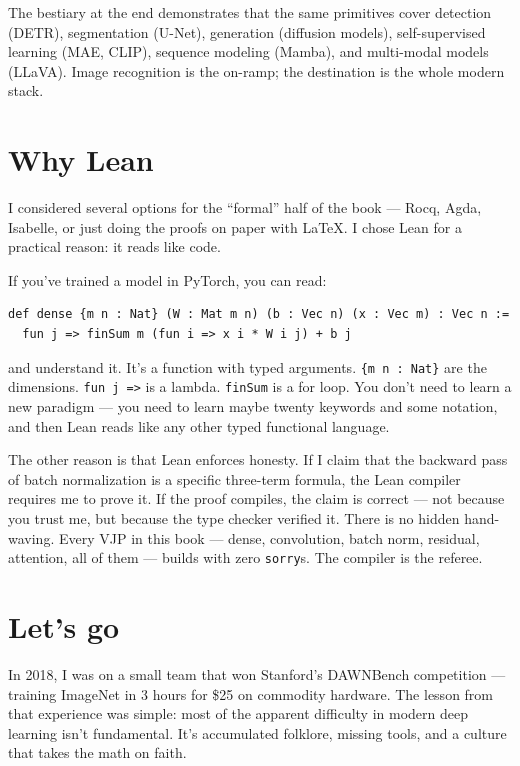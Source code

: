 The bestiary at the end demonstrates that the same primitives cover
detection (DETR), segmentation (U-Net), generation (diffusion models),
self-supervised learning (MAE, CLIP), sequence modeling (Mamba), and
multi-modal models (LLaVA). Image recognition is the on-ramp; the
destination is the whole modern stack.

\section*{Why Lean}

I considered several options for the ``formal'' half of the book ---
Rocq, Agda, Isabelle, or just doing the proofs on paper with LaTeX.
I chose Lean for a practical reason: it reads like code.

If you've trained a model in PyTorch, you can read:

\begin{verbatim}
def dense {m n : Nat} (W : Mat m n) (b : Vec n) (x : Vec m) : Vec n :=
  fun j => finSum m (fun i => x i * W i j) + b j
\end{verbatim}

and understand it. It's a function with typed arguments.
\texttt{\{m n : Nat\}} are the dimensions. \texttt{fun j =>} is a lambda.
\texttt{finSum} is a for loop. You don't need to learn a new paradigm
--- you need to learn maybe twenty keywords and some notation, and then
Lean reads like any other typed functional language.

The other reason is that Lean enforces honesty. If I claim that the
backward pass of batch normalization is a specific three-term formula,
the Lean compiler requires me to prove it. If the proof compiles,
the claim is correct --- not because you trust me, but because the
type checker verified it. There is no hidden hand-waving. Every VJP
in this book --- dense, convolution, batch norm, residual, attention,
all of them --- builds with zero \texttt{sorry}s. The compiler is the
referee.

\section*{Let's go}

In 2018, I was on a small team that won Stanford's DAWNBench
competition --- training ImageNet in 3 hours for \$25 on commodity
hardware. The lesson from that experience was simple: most of the
apparent difficulty in modern deep learning isn't fundamental. It's
accumulated folklore, missing tools, and a culture that takes the math
on faith.

